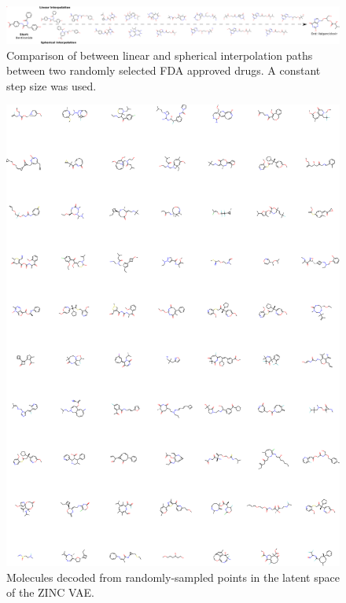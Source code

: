 \begin{figure}
\centering
\includegraphics[width=\columnwidth]{./Slerp-lerp_compare.png}
\caption[Comparison of Interpolation Methods]{Comparison of between linear and spherical interpolation paths between two randomly selected FDA approved drugs. A constant step size was used.}
\label{fig:interpol_1}
\end{figure}


\begin{figure}[h]
\centering
\includegraphics[width=0.9\columnwidth]{./VAE_random.png}
\caption[Random molecules sampled from Variational Autoencoder]{Molecules decoded from randomly-sampled points in the latent space of the ZINC VAE.}
\label{fig:random_3}
\end{figure}
